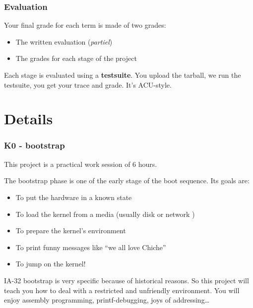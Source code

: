 
\begin{frame}
  \frametitle{Evaluation}

  Your final grade for each term is made of two grades:

  \begin{itemize}
  \item
    The written evaluation (\emph{partiel})
  \item
    The grades for each stage of the project
  \end{itemize}

  \-

  Each stage is evaluated using a \textbf{testsuite}. You upload the
  tarball, we run the testsuite, you get your trace and grade. It's
  ACU-style.

\end{frame}

%
%

\section{Details}


\begin{frame}
  \frametitle{K0 - bootstrap}

  This project is a practical work session of 6 hours.

  \-

  The bootstrap phase is one of the early stage of the boot
  sequence. Its goals are:

  \begin{itemize}
  \item
    To put the hardware in a known state
  \item
    To load the kernel from a media (usually disk or network )
  \item
    To prepare the kernel's environment
  \item
    To print funny messages like ``we all love Chiche''
  \item
    To jump on the kernel!
  \end{itemize}

  \-

  IA-32 bootstrap is very specific because of historical reasons. So
  this project will teach you how to deal with a restricted and
  unfriendly environment. You will enjoy assembly programming,
  printf-debugging, joys of addressing\ldots

\end{frame}

